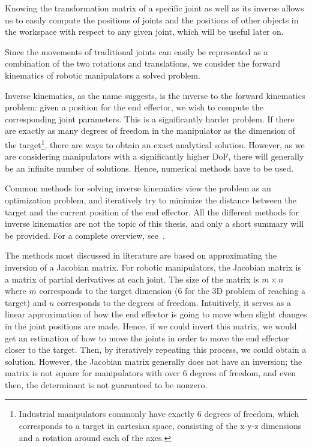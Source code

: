 Knowing the transformation matrix of a specific joint as well as its inverse allows us to easily compute the positions of joints and the positions of other objects in the workspace with respect to any given joint, which will be useful later on.

Since the movements of traditional joints can easily be represented as a combination of the two rotations and translations, we consider the forward kinematics of robotic manipulators a solved problem.

Inverse kinematics, as the name suggests, is the inverse to the forward kinematics problem: given a position for the end effector, we wish to compute the corresponding joint parameters. This is a significantly harder problem. If there are exactly as many degrees of freedom in the manipulator as the dimension of the target\footnote{Industrial manipulators commonly have exactly 6 degrees of freedom, which corresponds to a target in cartesian space, consisting of the x-y-z dimensions and a rotation around each of the axes.}, there are ways to obtain an exact analytical solution. However, as we are considering manipulators with a significantly higher DoF, there will generally be an infinite number of solutions. Hence, numerical methods have to be used.

Common methods for solving inverse kinematics view the problem as an optimization problem, and iteratively try to minimize the distance between the target and the current position of the end effector. All the different methods for inverse kinematics are not the topic of this thesis, and only a short summary will be provided. For a complete overview, see~\cite{overview}.

The methods most discussed in literature are based on approximating the inversion of a Jacobian matrix. For robotic manipulators, the Jacobian matrix is a matrix of partial derivatives at each joint. The size of the matrix is $m \times n$ where $m$ corresponds to the target dimension (6 for the 3D problem of reaching a target) and $n$ corresponds to the degrees of freedom.
Intuitively, it serves as a linear approximation of how the end effector is going to move when slight changes in the joint positions are made. Hence, if we could invert this matrix, we would get an estimation of how to move the joints in order to move the end effector closer to the target. Then, by iteratively repeating this process, we could obtain a solution. However, the Jacobian matrix generally does not have an inversion; the matrix is not square for manipulators with over 6 degrees of freedom, and even then, the determinant is not guaranteed to be nonzero.

